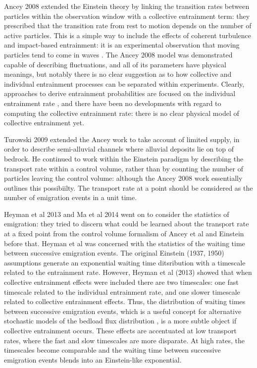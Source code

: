 Ancey 2008 extended the Einstein theory by linking the transition rates between particles within the observation window with a collective entrainment term: they prescribed that the transition rate from rest to motion depends on the number of active particles. 
This is a simple way to include the effects of coherent turbulence and impact-based entrainment: it is an experimental observation that moving particles tend to come in waves \citep{Drake1988}. 
The Ancey 2008 model was demonstrated capable of describing fluctuations, and all of its parameters have physical meanings, but notably there is no clear suggestion as to how collective and individual entrainment processes can be separated within experiments. 
Clearly, approaches to derive entrainment probabilities are focused on the individual entrainment rate \citep{Dey2018}, and there have been no developments with regard to computing the collective entrainment rate: there is no clear physical model of collective entrainment yet. 

Turowski 2009 extended the Ancey work to take account of limited supply, in order to describe semi-alluvial channels where alluvial deposits lie on top of bedrock. 
He continued to work within the Einstein paradigm by describing the transport rate within a control volume, rather than by counting the number of particles leaving the control volume: although the Ancey 2008 work essentially outlines this possibiilty. The transport rate at a point should be considered as the number of emigration events in a unit time. 

Heyman et al 2013 and Ma et al 2014 went on to consider the statistics of emigration: they tried to discern what could be learned about the transport rate at a fixed point from the control volume formalism of Ancey et al and Einstein before that. 
Heyman et al was concerned with the statistics of the waiting time between successive emigration events. 
The original Einstein (1937, 1950) assumptions generate an exponential waiting time ditsribution with a timescale related to the entrainment rate.  
However, Heyman et al (2013) showed that when collective entrainment effects were included there are two timescales: one fast timescale related to the individual entrainment rate, and one slower timescale related to collective entrainment effects. 
Thus, the distribution of waiting times between successive emigration events, which is a useful concept for alternative stochastic models of the bedload flux distribution \citep[e.g.][]{Turowski2010}, is a more subtle object if collective entrainment occurs. 
These effects are accentuated at low transport rates, where the fast and slow timescales are more disparate. 
At high rates, the timescales become comparable and the waiting time between successive emigration events blends into an Einstein-like exponential. 

